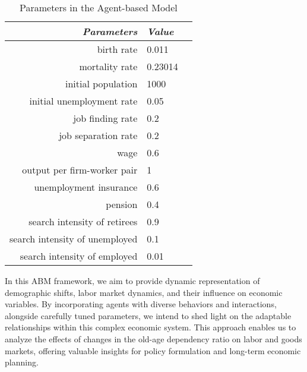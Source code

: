 \documentclass[ %
    final,
    scrbook,
    listoffigures,
    listoftables, 
    glossary]{cu-thesis}
\begin{document}
\begin{table}[t]
\centering
\caption{Parameters in the Agent-based Model}
\label{tab:para}
\begin{tabular}{rll}\toprule
\textit{Parameters} & \textit{Value} \\ \midrule
birth rate & 0.011\\
  mortality rate & 0.23014 \\
		initial population & 1000 \\
		initial unemployment rate & 0.05 \\
  job finding rate & 0.2 \\
  job separation rate & 0.2 \\
  wage & 0.6 \\
  output per firm-worker pair  & 1 \\
  unemployment insurance  & 0.6 \\
  pension   & 0.4 \\
  search intensity of retirees & 0.9 \\
  search intensity of unemployed   & 0.1 \\
  search intensity of employed  & 0.01 \\
 \bottomrule
\end{tabular}
\end{table}

\iffalse
The agents interact within a dynamic environment that encapsulates the labor and goods markets. The environment is the stage where agents engage in transactions, and its conditions evolve over time as agents make decisions that impact supply, demand, and overall market dynamics.
\fi

\iffalse
In this ABM framework, we aim to provide dynamic representation of demographic shifts, labor market dynamics, and their influence on economic variables. By incorporating agents with diverse behaviors and interactions, alongside carefully tuned parameters, we intend to shed light on the adaptable relationships within this complex economic system. This approach enables us to analyze the effects of changes in the old-age dependency ratio on labor and goods markets, offering valuable insights for policy formulation and long-term economic planning.
\end{document}
